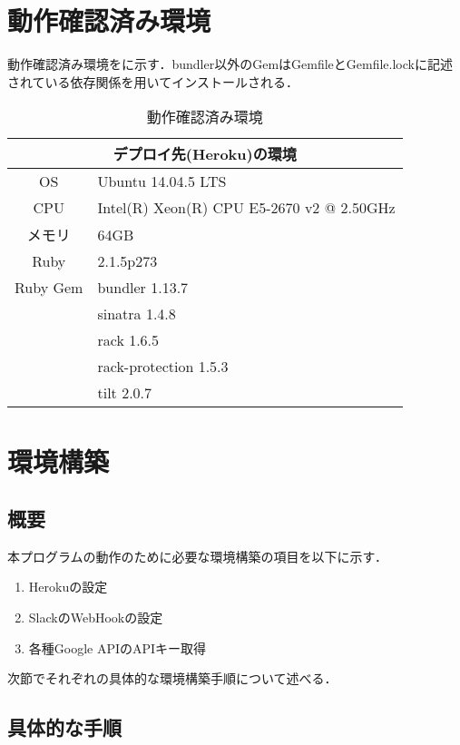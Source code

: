 \documentclass[fleqn, 14pt]{extarticlej}
\begin{document}
\section{動作確認済み環境}
動作確認済み環境をに示す．bundler以外のGemはGemfileとGemfile.lockに記述されている依存関係を用いてインストールされる．

\begin{table}[t]
  \begin{center}
    \caption{動作確認済み環境}
    \label{tab:env}
    \begin{tabular}{|c|l|} \hline
      \multicolumn{2}{|c|}{デプロイ先(Heroku)の環境}\\ \hline \hline
      OS & Ubuntu 14.04.5 LTS\\ 
      CPU & Intel(R) Xeon(R) CPU E5-2670 v2 @ 2.50GHz\\ 
      メモリ & 64GB\\
      Ruby & 2.1.5p273 \\
      Ruby Gem & bundler 1.13.7\\
      & sinatra 1.4.8 \\
      & rack 1.6.5 \\
      & rack-protection 1.5.3 \\
      & tilt 2.0.7 \\ \hline
    \end{tabular}
  \end{center}
\end{table}

\section{環境構築}
\subsection{概要}
本プログラムの動作のために必要な環境構築の項目を以下に示す．

\begin{enumerate}
  \item Herokuの設定
  \item SlackのWebHookの設定
  \item 各種Google APIのAPIキー取得
\end{enumerate}

次節でそれぞれの具体的な環境構築手順について述べる．

\subsection{具体的な手順}
\end{document}
